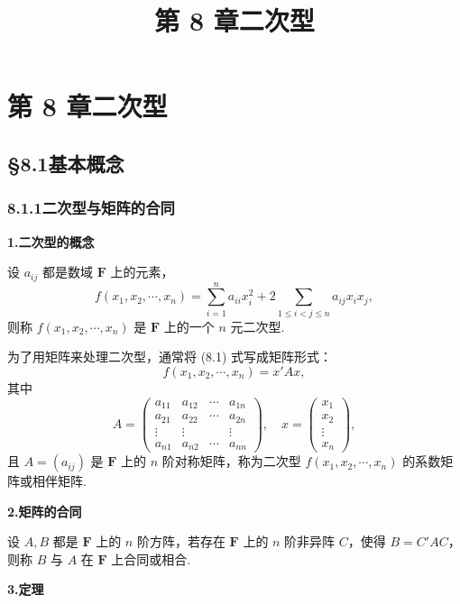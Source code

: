 \documentclass[UTF8,12pt,a4paper,fontset=fandol]{ctexart}
\title{第 8 章\quad 二次型}
\author{}
\date{}
\begin{document}
\maketitle

\section*{第 8 章\quad 二次型}

\subsection*{§8.1\quad 基本概念}

\subsubsection*{8.1.1\quad 二次型与矩阵的合同}

\noindent\textbf{1.\quad 二次型的概念}

设 $a_{ij}$ 都是数域 $\mathbf{F}$ 上的元素，
\begin{equation}
f(x_1,x_2,\cdots,x_n)=\sum_{i=1}^n a_{ii}x_i^2
+2\sum_{1\le i<j\le n}a_{ij}x_ix_j,
\tag{8.1}
\end{equation}
则称 $f(x_1,x_2,\cdots,x_n)$ 是 $\mathbf{F}$ 上的一个 $n$ 元二次型.

为了用矩阵来处理二次型，通常将 (8.1) 式写成矩阵形式：
\[
f(x_1,x_2,\cdots,x_n)=x' A x,
\]
其中
\[
A=\left(\begin{array}{cccc}
a_{11} & a_{12} & \cdots & a_{1n}\\
a_{21} & a_{22} & \cdots & a_{2n}\\
\vdots & \vdots &        & \vdots\\
a_{n1} & a_{n2} & \cdots & a_{nn}
\end{array}\right),\quad
x=\left(\begin{array}{c}
x_1\\
x_2\\
\vdots\\
x_n
\end{array}\right),
\]
且 $A=(a_{ij})$ 是 $\mathbf{F}$ 上的 $n$ 阶对称矩阵，称为二次型 $f(x_1,x_2,\cdots,x_n)$ 的系数矩阵或相伴矩阵.

\noindent\textbf{2.\quad 矩阵的合同}

设 $A,B$ 都是 $\mathbf{F}$ 上的 $n$ 阶方阵，若存在 $\mathbf{F}$ 上的 $n$ 阶非异阵 $C$，使得 $B=C'AC$，则称 $B$ 与 $A$ 在 $\mathbf{F}$ 上合同或相合.

\noindent\textbf{3.\quad 定理}
\end{document}
